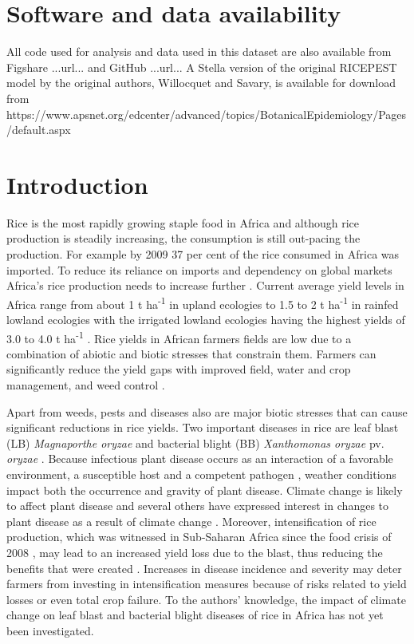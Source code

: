 \documentclass[preprint,12pt]{elsarticle}
\begin{document}
\section{Software and data availability}
All code used for analysis and data used in this dataset are also available from Figshare ...url... and GitHub ...url... A Stella version of the original RICEPEST model by the original authors, Willocquet and Savary, is available for download from\\ {\scriptsize https://www.apsnet.org/edcenter/advanced/topics/BotanicalEpidemiology/Pages/default.aspx}


\section{Introduction}
Rice is the most rapidly growing staple food in Africa and although rice production is steadily increasing, the consumption is still out-pacing the production. For example by 2009 37 per cent of the rice consumed in Africa was imported. To reduce its reliance on imports and dependency on global markets Africa's rice production needs to increase further \cite{Seck2013}. Current average yield levels in Africa range from about 1 t ha\textsuperscript{-1} in upland ecologies to 1.5 to 2 t ha\textsuperscript{-1} in rainfed lowland ecologies with the irrigated lowland ecologies having the highest yields of 3.0 to 4.0 t ha\textsuperscript{-1} \cite{Diagne2013}. Rice yields in African farmers fields are low due to a combination of abiotic and biotic stresses that constrain them. Farmers can significantly reduce the yield gaps with improved field, water and crop management, and weed control \cite{Saito2013}.

Apart from weeds, pests and diseases also are major biotic stresses that can cause significant reductions in rice yields. Two important diseases in rice are leaf blast (LB) \textit{Magnaporthe oryzae} and bacterial blight (BB) \textit{Xanthomonas oryzae} pv. \textit{oryzae} \cite{Verdier2012}. Because infectious plant disease occurs as an interaction of a favorable environment, a susceptible host and a competent pathogen \cite{Madden2007}, weather conditions impact both the occurrence and gravity of plant disease. Climate change is likely to affect plant disease \cite{Anderson2004, Coakley1999, Garrett2006} and several others have expressed interest in changes to plant disease as a result of climate change \cite{Chakraborty2011, Juroszek2011, Luck2011, Pautasso2010, Savary2011, Sutherst2011}. Moreover, intensification of rice production, which was witnessed in Sub-Saharan Africa since the food crisis of 2008 \cite{Saito2013}, may lead to an increased yield loss due to the blast, thus reducing the benefits that were created \cite{Sere2013}. Increases in disease incidence and severity may deter farmers from investing in intensification measures because of risks related to yield losses or even total crop failure. To the authors' knowledge, the impact of climate change on leaf blast and bacterial blight diseases of rice in Africa has not yet been investigated.
\end{document}
